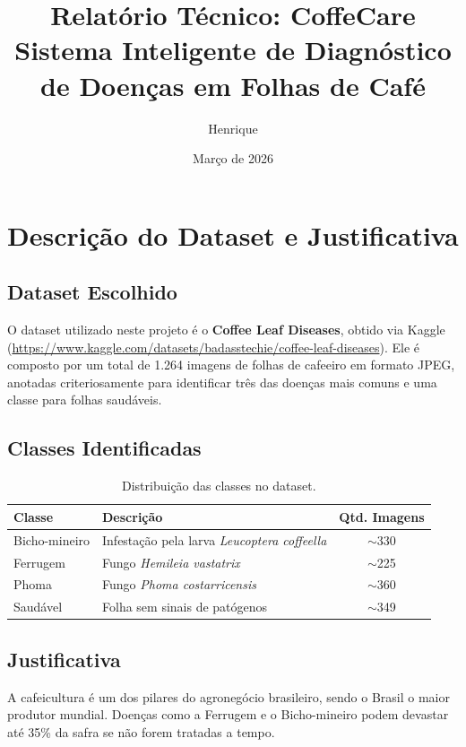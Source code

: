\documentclass[12pt,a4paper]{article}
\title{Relatório Técnico: CoffeCare\\ \large Sistema Inteligente de Diagnóstico de Doenças em Folhas de Café}
\author{Henrique}
\date{Março de 2026}
\begin{document}
\maketitle

\tableofcontents
\newpage

\section{Descrição do Dataset e Justificativa}

\subsection{Dataset Escolhido}
O dataset utilizado neste projeto é o \textbf{Coffee Leaf Diseases}, obtido via Kaggle (\url{https://www.kaggle.com/datasets/badasstechie/coffee-leaf-diseases}). Ele é composto por um total de 1.264 imagens de folhas de cafeeiro em formato JPEG, anotadas criteriosamente para identificar três das doenças mais comuns e uma classe para folhas saudáveis.

\subsection{Classes Identificadas}
\begin{table}[h!]
\centering
\begin{tabular}{@{}llc@{}}
\toprule
\textbf{Classe} & \textbf{Descrição} & \textbf{Qtd. Imagens} \\ \midrule
Bicho-mineiro & Infestação pela larva \textit{Leucoptera coffeella} & $\sim$330 \\
Ferrugem & Fungo \textit{Hemileia vastatrix} & $\sim$225 \\
Phoma & Fungo \textit{Phoma costarricensis} & $\sim$360 \\
Saudável & Folha sem sinais de patógenos & $\sim$349 \\ \bottomrule
\end{tabular}
\caption{Distribuição das classes no dataset.}
\end{table}

\subsection{Justificativa}
A cafeicultura é um dos pilares do agronegócio brasileiro, sendo o Brasil o maior produtor mundial. Doenças como a Ferrugem e o Bicho-mineiro podem devastar até 35\% da safra se não forem tratadas a tempo. 
\end{document}
